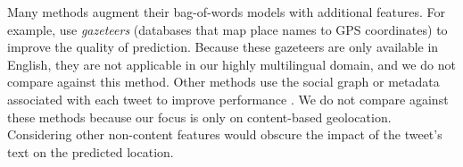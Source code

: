 \documentclass[sigconf,anonymous,review]{acmart}
\newcommand{\defn}[1]{\textit{#1}}
\newcommand{\fixme}[1]{\textcolor{red}{\textbf{FIXME:} {#1}}}
\begin{document}
\begin{description}
Many methods augment their bag-of-words models with additional features.
For example, \citet{zhang2014geocoding} use \defn{gazeteers} 
(databases that map place names to GPS coordinates) to improve the quality of prediction. 
Because these gazeteers are only available in English,
they are not applicable in our highly multilingual domain,
and we do not compare against this method.
Other methods use the social graph or metadata associated with each tweet to improve performance \citep[e.g.][]{hecht2011tweets,schulz2013multi,han2014text}.
We do not compare against these methods because our focus is only on content-based geolocation.
Considering other non-content features would obscure the impact of the tweet's text on the predicted location.


%


\end{description}
\end{document}
